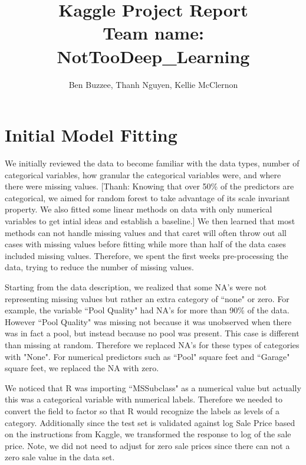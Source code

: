 \documentclass[12pt]{article}
\title{Kaggle Project Report \\ Team name: NotTooDeep\_Learning}
\author{Ben Buzzee, Thanh Nguyen, Kellie McClernon}
\newcommand{\thanh}[1]{{\color{blue} [Thanh: #1]}}
\begin{document}
\maketitle



\section{Initial Model Fitting}

We initially reviewed the data to become familiar with the data types, number of categorical variables, how granular the categorical variables were, and where there were missing values. \thanh{Knowing that over 50\% of the predictors are categorical, we aimed for random forest to take advantage of its scale invariant property. We also fitted some linear methods on data with only numerical variables to get intial ideas and establish a baseline.}  %
We then learned that most methods can not handle missing values and that caret will often throw out all cases with missing values before fitting while more than half of the data cases included missing values. %
Therefore, we spent the first weeks pre-processing the data, trying to reduce the number of missing values.

Starting from the data description, we realized that some NA's were not representing missing values but rather an extra category of ``none" or zero.  For example, the variable ``Pool Quality" had NA's for more than 90\% of the data.  However ``Pool Quality" was missing not because it was unobserved when there was in fact a pool, but instead because no pool was present.  This case is different than missing at random.  Therefore we replaced NA's for these types of categories with "None".  For numerical predictors such as ``Pool" square feet and ``Garage" square feet, we replaced the NA with zero.

We noticed that R was importing ``MSSubclass" as a numerical value but actually this was a categorical variable with numerical labels.  Therefore we needed to convert the field to factor so that R would recognize the labels as levels of a category.  Additionally since the test set is validated against log Sale Price based on the instructions from Kaggle, we transformed the response to log of the sale price.  Note,  we did not need to adjust for zero sale prices since there can not a zero sale value in the data set.
\end{document}
